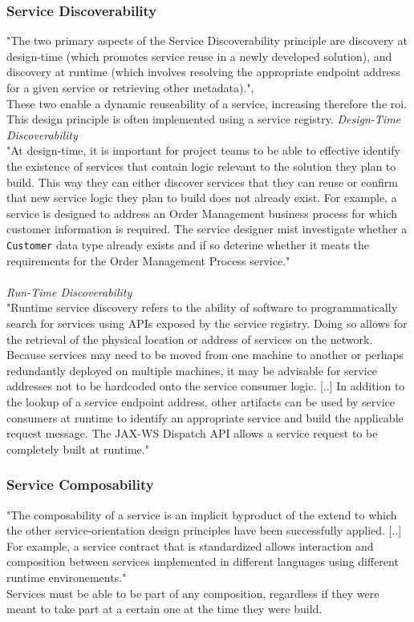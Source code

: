 \documentclass[12pt]{article}
\begin{document}
\subsubsection{Service Discoverability}
\label{sec:disc}
"The two primary aspects of the Service Discoverability principle are discovery at design-time (which promotes service reuse in a newly developed solution), and discovery at runtime (which involves resolving the appropriate endpoint address for a given service or retrieving other metadata).", \cite[page 204]{grau}\\These two enable a dynamic reuseability of a service, increasing therefore the \gls{roi}. This design principle is often implemented using a service registry. \cite[page 89]{te} \newpage
\textit{Design-Time Discoverability}\\
"At design-time, it is important for project teams to be able to effective identify the existence of services that contain logic relevant to the solution they plan to build. This way they can either discover services that they can reuse or confirm that new service logic they plan to build does not already exist. For example, a service is designed to address an Order Management business process for which customer information is required. The service designer mist investigate whether a \texttt{Customer} data type already exists and if so deterine whether it meats the requirements for the Order Management Process service." \cite[page 204-205]{grau}\\\\
\textit{Run-Time Discoverability}\\
"Runtime service discovery refers to the ability of software to programmatically search for services using APIs exposed by the service registry. Doing so allows for the retrieval of the physical location or address of services on the network. Because services may need to be moved from one machine to another or perhaps redundantly deployed on multiple machines, it may be advisable for service addresses not to be hardcoded onto the service consumer logic. [..] In addition to the lookup of a service endpoint address, other artifacts can be used by service consumers at runtime to identify an appropriate service and build the applicable request message. The JAX-WS Dispatch API allows a service request to be completely built at runtime."\cite[page 205-207]{grau}
\subsubsection{Service Composability} 
"The composability of a service is an implicit byproduct of the extend to which the other service-orientation design principles have been successfully applied. [..] For example, a service contract that is standardized allows interaction and composition between services implemented in different languages using different runtime environements."\cite[page 189]{grau}\\
Services must be able to be part of any composition, regardless if they were meant to take part at a certain one at the time they were build. \cite[page 89]{te}
\end{document}
